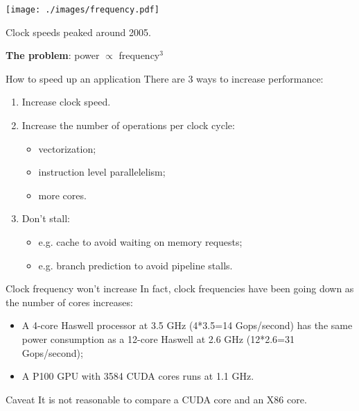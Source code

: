 \documentclass[aspectratio=43]{beamer}
\begin{document}
\begin{frame}[fragile]{}
    \begin{center}
        \texttt{[image: ./images/frequency.pdf]}

        Clock speeds peaked around 2005.

        \textbf{The problem}: power $\propto$ frequency$^3$
    \end{center}
\end{frame}

\begin{frame}[fragile]{How to speed up an application}
    There are 3 ways to increase performance:
    \begin{enumerate}
        \item Increase clock speed.
        \item Increase the number of operations per clock cycle:
        \begin{itemize}
            \item vectorization;
            \item instruction level parallelelism;
            \item more cores.
        \end{itemize}
        \item Don't stall:
        \begin{itemize}
            \item e.g. cache to avoid waiting on memory requests;
            \item e.g. branch prediction to avoid pipeline stalls.
        \end{itemize}
    \end{enumerate}
\end{frame}

\begin{frame}[fragile]{Clock frequency won't increase}
    In fact, clock frequencies have been going down as the number of cores increases:
    \begin{itemize}
        \item A 4-core Haswell processor at 3.5 GHz (4*3.5=14 Gops/second) has the same power consumption as a 12-core Haswell at 2.6 GHz (12*2.6=31 Gops/second);
        \item A P100 GPU with 3584 CUDA cores runs at 1.1 GHz.
    \end{itemize}

    \begin{info}{Caveat}
        It is not reasonable to compare a CUDA core and an X86 core.
    \end{info}
\end{frame}
\end{document}
